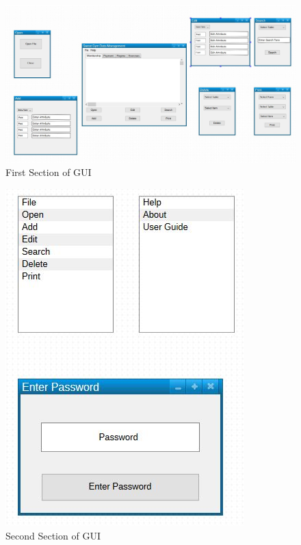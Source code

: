 \begin{figure}[H]
    \includegraphics[width=\textwidth]{GUI_DESIGNS.JPG}
    \caption{First Section of GUI} \label{fig:First Section of GUI}
\end{figure}

\begin{figure}[H]
    \includegraphics[width=\textwidth]{GUI_DESIGNS_2.jpg}
    \caption{Second Section of GUI} \label{fig:Second Section of GUI}
\end{figure}

